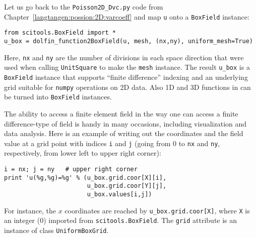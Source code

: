 Let us go back to the {\fontsize{12pt}{12pt}\verb!Poisson2D_Dvc.py!} code from
Chapter~\ref{langtangen:possion:2D:varcoeff} and map {\fontsize{12pt}{12pt}\texttt{u}} onto a
{\fontsize{12pt}{12pt}\texttt{BoxField}} instance:
\begin{Verbatim}[fontsize=\fontsize{10pt}{10pt},tabsize=8,baselinestretch=1.05,
fontfamily=tt,xleftmargin=7mm]
from scitools.BoxField import *
u_box = dolfin_function2BoxField(u, mesh, (nx,ny), uniform_mesh=True)
\end{Verbatim}
\noindent
Here, {\fontsize{12pt}{12pt}\texttt{nx}} and {\fontsize{12pt}{12pt}\texttt{ny}} are the number of divisions in each space
direction that were used when calling {\fontsize{12pt}{12pt}\texttt{UnitSquare}} to make the
{\fontsize{12pt}{12pt}\texttt{mesh}} instance. 
The result {\fontsize{12pt}{12pt}\verb!u_box!} is a {\fontsize{12pt}{12pt}\texttt{BoxField}}
instance that supports ``finite difference'' indexing and an underlying
grid suitable for {\fontsize{12pt}{12pt}\texttt{numpy}} operations on 2D data.
Also 1D and 3D functions in \dolfin{} can be turned
into {\fontsize{12pt}{12pt}\texttt{BoxField}} instances.

The ability to access a finite element field in the way one can access
a finite difference-type of field is handy in many occasions, including
visualization and data analysis.
Here is an example of writing out the coordinates and the field value
at a grid point with indices {\fontsize{12pt}{12pt}\texttt{i}} and {\fontsize{12pt}{12pt}\texttt{j}} (going from 0 to
{\fontsize{12pt}{12pt}\texttt{nx}} and {\fontsize{12pt}{12pt}\texttt{ny}}, respectively, from lower left to upper right corner):
\begin{Verbatim}[fontsize=\fontsize{10pt}{10pt},tabsize=8,baselinestretch=1.05,
fontfamily=tt,xleftmargin=7mm]
i = nx; j = ny   # upper right corner
print 'u(%g,%g)=%g' % (u_box.grid.coor[X][i],
                       u_box.grid.coor[Y][j],
                       u_box.values[i,j])
\end{Verbatim}
\noindent
For instance,
the $x$ coordinates are reached by {\fontsize{12pt}{12pt}\verb!u_box.grid.coor[X]!}, where
{\fontsize{12pt}{12pt}\texttt{X}} is an integer (0) imported from {\fontsize{12pt}{12pt}\texttt{scitools.BoxField}}.
The {\fontsize{12pt}{12pt}\texttt{grid}} attribute is an instance of class {\fontsize{12pt}{12pt}\texttt{UniformBoxGrid}}.

